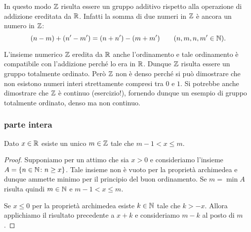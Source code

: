 In questo modo ${\mathbb Z}$ risulta essere un gruppo additivo
rispetto alla operazione di addizione ereditata da ${\mathbb R}$.
Infatti la somma di due numeri in ${\mathbb Z}$ è ancora 
un numero in ${\mathbb Z}$:
\[
  (n-m) + (n'-m') = (n+n') - (m+m')
  \qquad\text{($n,m,n,m'\in {\mathbb N})$.}
\]

L'insieme numerico ${\mathbb Z}$ eredita da ${\mathbb R}$ anche 
l'ordinamento e tale ordinamento è compatibile con l'addizione 
perché lo era in ${\mathbb R}$. Dunque ${\mathbb Z}$ risulta essere un gruppo 
totalmente ordinato.
Però ${\mathbb Z}$ non è denso perché si può dimostrare che 
non esistono numeri interi strettamente compresi tra $0$ e $1$.
Si potrebbe anche dimostrare che ${\mathbb Z}$ è continuo (esercizio!),
fornendo dunque un esempio di gruppo totalmente ordinato, 
denso ma non continuo.

\subsubsection{parte intera}

\begin{theorem}
\mymark{*}%
  Dato $x\in {\mathbb R}$ esiste un unico $m\in {\mathbb Z}$ tale che $m-1 < x \le m$.
\end{theorem}
%
\begin{proof}
  Supponiamo per un attimo che sia $x > 0$
  e consideriamo l'insieme $A={\left\{ n \in {\mathbb N} \colon n\ge x \right\}}$.
  Tale insieme non è vuoto per la proprietà archimedea 
  e dunque ammette minimo per il principio del buon ordinamento.
  Se $m=\min A$ risulta quindi $m\in {\mathbb N}$ e $m-1< x \le m$.

  Se $x\le 0$ per la proprietà archimedea esiste $k\in {\mathbb N}$ tale che 
  $k>-x$. Allora applichiamo il risultato precedente a $x+k$ e consideriamo 
  $m-k$ al posto di $m$.
\end{proof}

